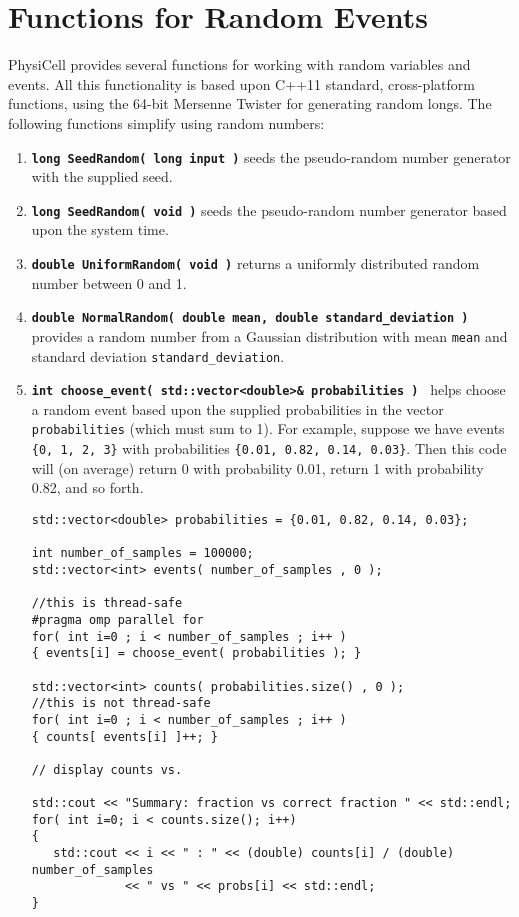 \documentclass[12pt]{article}
\renewcommand{\v}{\verb}
\newcommand{\smallcode}[1]{\textbf{\texttt{#1}}}
\begin{document}
\section{Functions for Random Events}
\label{sec:random_functions}
PhysiCell provides several functions for working with random variables and events. All this functionality is based upon C++11 standard, cross-platform functions, using the 64-bit Mersenne Twister for generating random longs. The following functions simplify using random numbers: 
\begin{enumerate}

\item 
\smallcode{long SeedRandom( long input )} seeds the pseudo-random number generator with the supplied seed.   

\item 
\smallcode{long SeedRandom( void )} seeds the pseudo-random number generator based upon the system time. 


\item 
\smallcode{double UniformRandom( void )} returns a uniformly distributed random number between 0 and 1. 

\item 
\smallcode{double NormalRandom( double mean, double standard\_deviation ) } provides a random number from a Gaussian distribution with mean \v|mean| and standard deviation \v|standard_deviation|. 

\item 
\smallcode{int choose\_event( std::vector<double>\& probabilities ) } helps choose a random event based upon the supplied probabilities in the vector \v|probabilities| (which must sum to 1). For example, suppose we have 
events \v|{0, 1, 2, 3}| with probabilities \v|{0.01, 0.82, 0.14, 0.03}|. Then this code will (on average) 
return 0 with probability 0.01, return 1 with probability 0.82, and so forth. 

\begin{verbatim}
std::vector<double> probabilities = {0.01, 0.82, 0.14, 0.03}; 

int number_of_samples = 100000; 
std::vector<int> events( number_of_samples , 0 ); 

//this is thread-safe 
#pragma omp parallel for 
for( int i=0 ; i < number_of_samples ; i++ )
{ events[i] = choose_event( probabilities ); }

std::vector<int> counts( probabilities.size() , 0 ); 
//this is not thread-safe 
for( int i=0 ; i < number_of_samples ; i++ )
{ counts[ events[i] ]++; }

// display counts vs. 
 
std::cout << "Summary: fraction vs correct fraction " << std::endl; 
for( int i=0; i < counts.size(); i++)
{
   std::cout << i << " : " << (double) counts[i] / (double) number_of_samples 
             << " vs " << probs[i] << std::endl;
} 
\end{verbatim}


\end{enumerate}
\end{document}
